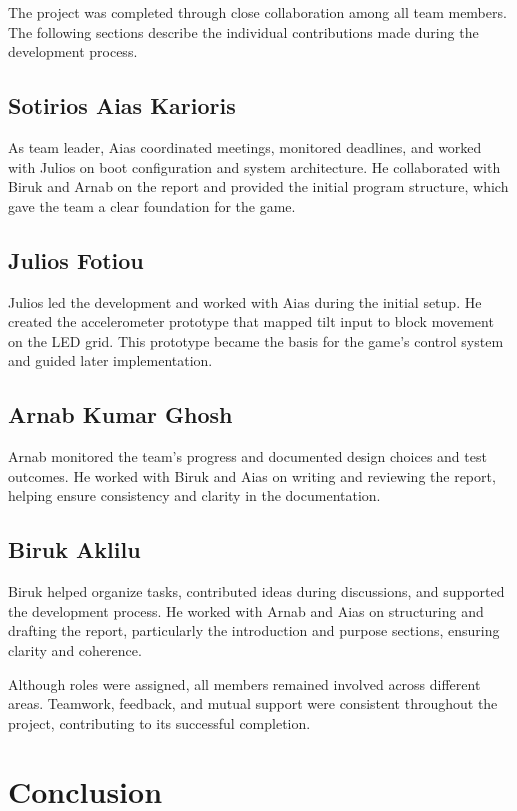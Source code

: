 \documentclass[12pt]{report}
\begin{document}
The project was completed through close collaboration among all team members. The following sections describe the individual contributions made during the development process.

\section{Sotirios Aias Karioris}
As team leader, Aias coordinated meetings, monitored deadlines, and worked with Julios on boot configuration and system architecture. He collaborated with Biruk and Arnab on the report and provided the initial program structure, which gave the team a clear foundation for the game.

\section{Julios Fotiou}
Julios led the development and worked with Aias during the initial setup. He created the accelerometer prototype that mapped tilt input to block movement on the LED grid. This prototype became the basis for the game's control system and guided later implementation.

\section{Arnab Kumar Ghosh}
Arnab monitored the team’s progress and documented design choices and test outcomes. He worked with Biruk and Aias on writing and reviewing the report, helping ensure consistency and clarity in the documentation.

\section{Biruk Aklilu}
Biruk helped organize tasks, contributed ideas during discussions, and supported the development process. He worked with Arnab and Aias on structuring and drafting the report, particularly the introduction and purpose sections, ensuring clarity and coherence.

\vspace{3ex}
Although roles were assigned, all members remained involved across different areas. Teamwork, feedback, and mutual support were consistent throughout the project, contributing to its successful completion.


\chapter{Conclusion}
\end{document}
